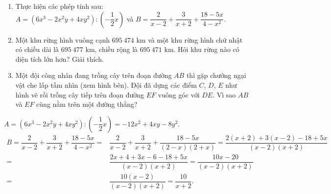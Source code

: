\begin{bt}%
\begin{enumerate}
	\item Thực hiện các phép tính sau:\\
	$A= (6x^3-2x^2y+4xy^2):\left(-\dfrac{1}{2}x\right)$ và $B =\dfrac{2}{x-2}+\dfrac{3}{x+2}+\dfrac{18-5x}{4-x^2}$.
	\item  Một khu rừng hình vuông cạnh $695 \ 474$ km và một khu rừng hình chữ nhật có chiều dài là $695 \ 477$ km, chiều rộng là $695 \ 471$ km. Hỏi khu rừng nào có diện tích lớn hơn? Giải thích.
	\item Một đội công nhân đang trồng cây trên đoạn đường $AB$	thì gặp chướng ngại vật che lấp tầm nhìn (xem hình bên).	Đội đã dựng các điểm $C$, $D$, $E$ như hình vẽ rồi trồng cây	tiếp trên đoạn đường $EF$ vuông góc với $DE$.	Vì sao $AB$ và $EF$ cùng nằm trên một đường thẳng?
	
\begin{center}
\end{center}
\end{enumerate}
	\loigiai
	{\begin{enumEX}{1}
			\item 	$A= (6x^3-2x^2y+4xy^2):\left(-\dfrac{1}{2}x\right) = -12x^2+4xy-8y^2.$
			\begin{align*}
			B=\dfrac{2}{x-2}+\dfrac{3}{x+2}+\dfrac{18-5x}{4-x^2}
			=& \dfrac{2}{x-2} + \dfrac{3}{x+2} +  \dfrac{18-5x}{(2-x)(2+x)}
			= \dfrac{2(x+2)+3(x-2)-18+5x}{(x-2)(x+2)}\\
		=&	\dfrac{2x+4+3x-6-18+5x}{(x-2)(x+2)}
			= \dfrac{10x-20}{(x-2)(x+2)}\\
			=& \dfrac{10(x-2)}{(x-2)(x+2)} = \dfrac{10}{x+2}.
			\end{align*}
			\item
		

\end{enumEX}}
\end{bt}
